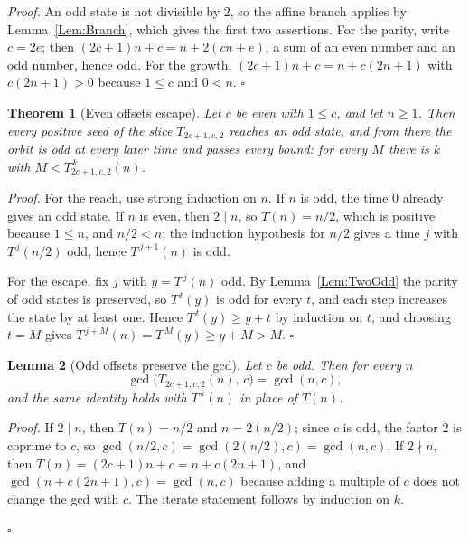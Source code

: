 \documentclass[11pt,letterpaper]{article}
\newtheorem{theorem}{Theorem}
\newtheorem{lemma}[theorem]{Lemma}
\newenvironment{proof}{\noindent\textit{Proof.}}{\hfill\(\square\)}
\begin{document}
\begin{proof}
An odd state is not divisible by \(2\), so the affine branch applies by
Lemma~\ref{Lem:Branch}, which gives the first two assertions. For the parity,
write \(c=2e\); then \((2c+1)n+c=n+2(cn+e)\), a sum of an even number and an
odd number, hence odd. For the growth,
\((2c+1)n+c=n+c(2n+1)\) with \(c(2n+1)>0\) because \(1\le c\) and \(0<n\).
\end{proof}

\begin{theorem}[Even offsets escape]\label{Thm:EvenEscape}
Let \(c\) be even with \(1\le c\), and let \(n\ge1\). Then every positive seed
of the slice \(T_{2c+1,c,2}\) reaches an odd state, and from there the orbit is
odd at every later time and passes every bound: for every \(M\) there is \(k\)
with \(M<T_{2c+1,c,2}^{\,k}(n)\).
\end{theorem}

\begin{proof}
For the reach, use strong induction on \(n\). If \(n\) is odd, the time \(0\)
already gives an odd state. If \(n\) is even, then \(2\mid n\), so
\(T(n)=n/2\), which is positive because \(1\le n\), and \(n/2<n\); the
induction hypothesis for \(n/2\) gives a time \(j\) with \(T^{\,j}(n/2)\) odd,
hence \(T^{\,j+1}(n)\) is odd.

For the escape, fix \(j\) with \(y=T^{\,j}(n)\) odd. By
Lemma~\ref{Lem:TwoOdd} the parity of odd states is preserved, so
\(T^{\,t}(y)\) is odd for every \(t\), and each step increases the state by at
least one. Hence \(T^{\,t}(y)\ge y+t\) by induction on \(t\), and choosing
\(t=M\) gives \(T^{\,j+M}(n)=T^{\,M}(y)\ge y+M>M\).
\end{proof}

\begin{lemma}[Odd offsets preserve the gcd]\label{Lem:OddGcd}
Let \(c\) be odd. Then for every \(n\)
\[
 \gcd\bigl(T_{2c+1,c,2}(n),\,c\bigr)=\gcd(n,c),
\]
and the same identity holds with \(T^{\,k}(n)\) in place of \(T(n)\).
\end{lemma}

\begin{proof}
If \(2\mid n\), then \(T(n)=n/2\) and \(n=2(n/2)\); since \(c\) is odd, the
factor \(2\) is coprime to \(c\), so \(\gcd(n/2,c)=\gcd(2(n/2),c)=\gcd(n,c)\).
If \(2\nmid n\), then \(T(n)=(2c+1)n+c=n+c(2n+1)\), and
\(\gcd(n+c(2n+1),c)=\gcd(n,c)\) because adding a multiple of \(c\) does not
change the gcd with \(c\). The iterate statement follows by induction on \(k\).

\end{proof}
\end{document}
